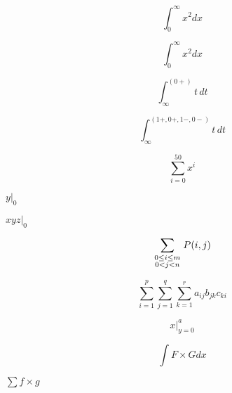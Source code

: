 \documentclass{article}
\begin{document}

\[ \int_0^\infty x^2 dx \]

\[ \int_0^\infty x^2 d\mathord{x} \]

\[ \int_\infty^{(0+)} t\,dt \]

\[ \int_\infty^{(1+,0+,1-,0-)} t\,dt \]

\[ \sum_{i=0}^{50} x^i \]

$\left. y \right|_0$

$\left. xyz \right|_0$

\[\sum_{\scriptstyle0\le i\le m\atop\scriptstyle0<j<n}P(i,j) \]

\[\sum_{i=1}^p\sum_{j=1}^q\sum_{k=1}^r a_{ij}b_{jk}c_{ki} \]

\[ x | ^{a}_{y=0} \] %

\[ \int F \times G dx \]

$\sum f \times g $ 
\end{document}

